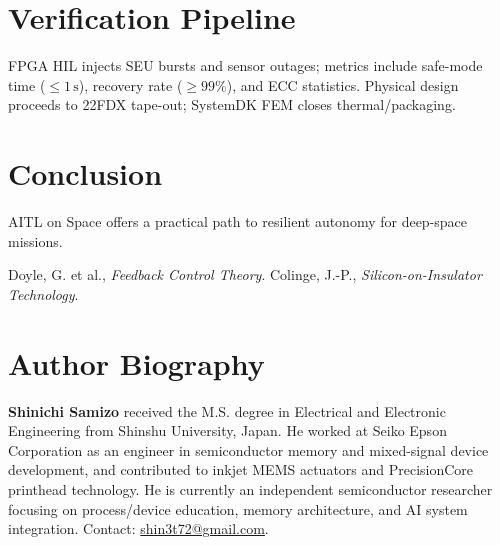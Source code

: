 \documentclass[conference]{IEEEtran}
\begin{document}
\section{Verification Pipeline}
FPGA HIL injects SEU bursts and sensor outages; metrics include safe-mode time ($\leq 1\,\mathrm{s}$), recovery rate ($\geq 99\%$), and ECC statistics. Physical design proceeds to 22FDX tape-out; SystemDK FEM closes thermal/packaging.

\section{Conclusion}
AITL on Space offers a practical path to resilient autonomy for deep-space missions.


\begin{thebibliography}{9}
 Doyle, G. et al., \emph{Feedback Control Theory}.
 Colinge, J.-P., \emph{Silicon-on-Insulator Technology}.
\end{thebibliography}

\section*{Author Biography}
\textbf{Shinichi Samizo} received the M.S. degree in Electrical and Electronic
Engineering from Shinshu University, Japan. He worked at Seiko Epson
Corporation as an engineer in semiconductor memory and mixed-signal
device development, and contributed to inkjet MEMS actuators and
PrecisionCore printhead technology. He is currently an independent
semiconductor researcher focusing on process/device education, memory
architecture, and AI system integration. Contact:
\href{mailto:shin3t72@gmail.com}{shin3t72@gmail.com}.
\end{document}
